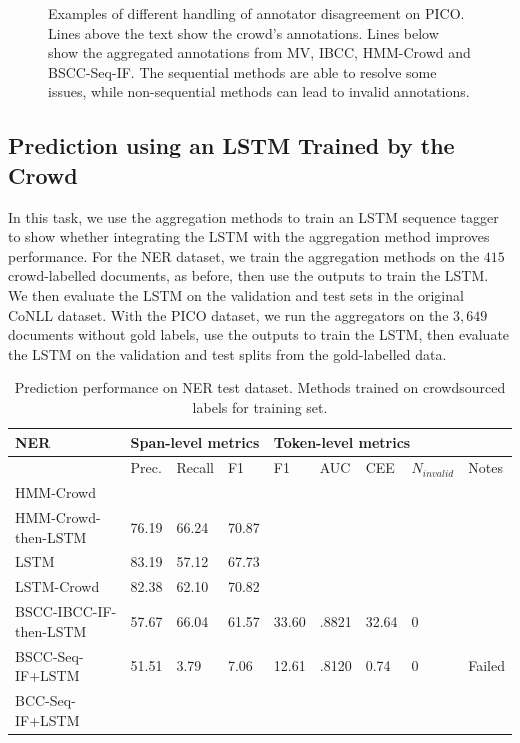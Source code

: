 \begin{figure}
{}
\caption{Examples of different handling of annotator disagreement on PICO. 
Lines above the text show the crowd's annotations. Lines below show the aggregated annotations from MV, IBCC, HMM-Crowd and BSCC-Seq-IF.
The sequential methods are able to resolve some issues, 
while non-sequential methods can lead to invalid annotations. }
\label{fig:disagreements}
\end{figure}

\subsection{Prediction using an LSTM Trained by the Crowd}\label{sec:task2}

In this task, we use the aggregation methods to train an LSTM sequence tagger \cite{lample2016}
to show whether integrating the LSTM with the aggregation method improves performance.
For the NER dataset, we train the aggregation methods on the $415$ crowd-labelled documents, as before,
then use the outputs to train the LSTM. We then evaluate the LSTM on the validation and test sets
in the original CoNLL dataset.
With the PICO dataset, we run the aggregators on the $3,649$ documents without gold labels, 
use the outputs to train the LSTM, then evaluate the LSTM on the validation and test splits from the gold-labelled data.


\begin{table}
\begin{tabularx}{\textwidth}{| l | X | X | X | X | X | X | X | X |}
\hline
NER & \multicolumn{3}{|l|}{Span-level metrics}                     & \multicolumn{4}{|l|}{Token-level metrics} \\ \hline 
& Prec. & Recall & F1 & F1 & AUC & CEE & $N_{invalid}$ & Notes  \\ \hline
HMM-Crowd &  \\ 
HMM-Crowd-then-LSTM & 76.19 & 66.24 & 70.87 &\\ 
LSTM & 83.19 & 57.12 & 67.73 \\ 
LSTM-Crowd & 82.38 & 62.10 & 70.82 \\ \hline
BSCC-IBCC-IF-then-LSTM & 57.67 & 66.04 & 61.57 & 33.60 & .8821 & 32.64 & 0 \\ %
BSCC-Seq-IF+LSTM & 51.51 & 3.79 & 7.06 & 12.61 & .8120 & 0.74 & 0 & Failed \\ %
BCC-Seq-IF+LSTM &\\
\hline
\end{tabularx}
\caption{Prediction performance on NER test dataset. Methods trained on crowdsourced labels for training set.}
\label{tab:prediction_results_ner}
\end{table}

